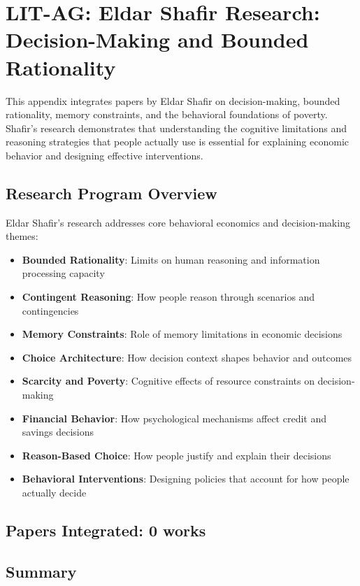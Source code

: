 
\section{LIT-AG: Eldar Shafir Research: Decision-Making and Bounded Rationality}
\label{app:litag}

This appendix integrates papers by Eldar Shafir on decision-making, bounded rationality, memory constraints, and the behavioral foundations of poverty. Shafir's research demonstrates that understanding the cognitive limitations and reasoning strategies that people actually use is essential for explaining economic behavior and designing effective interventions.

\subsection{Research Program Overview}

Eldar Shafir's research addresses core behavioral economics and decision-making themes:

\begin{itemize}
  \item \textbf{Bounded Rationality}: Limits on human reasoning and information processing capacity
  \item \textbf{Contingent Reasoning}: How people reason through scenarios and contingencies
  \item \textbf{Memory Constraints}: Role of memory limitations in economic decisions
  \item \textbf{Choice Architecture}: How decision context shapes behavior and outcomes
  \item \textbf{Scarcity and Poverty}: Cognitive effects of resource constraints on decision-making
  \item \textbf{Financial Behavior}: How psychological mechanisms affect credit and savings decisions
  \item \textbf{Reason-Based Choice}: How people justify and explain their decisions
  \item \textbf{Behavioral Interventions}: Designing policies that account for how people actually decide
\end{itemize}

\subsection{Papers Integrated: 0 works}


\subsection{Summary}

